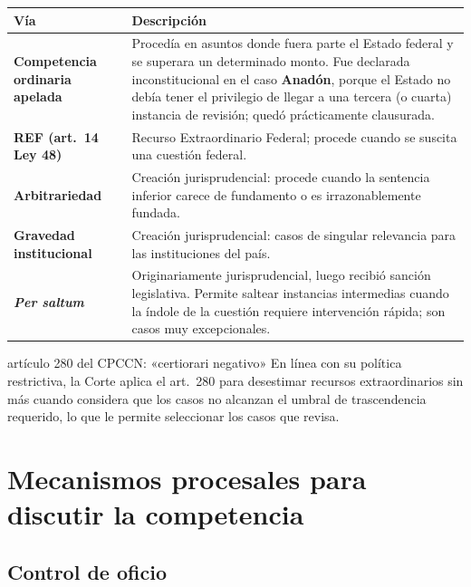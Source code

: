 \documentclass[12pt,oneside]{book}
\renewcommand{\arraystretch}{1.15}
\begin{document}
\begin{table}[H]
\centering
\renewcommand{\arraystretch}{1.3}
\begin{tabularx}{\textwidth}{>{\RaggedRight\arraybackslash}p{}>{\RaggedRight\arraybackslash}X}
\toprule
\textbf{Vía} & \textbf{Descripción} \\
\midrule
\textbf{Competencia ordinaria apelada} & Procedía en asuntos donde fuera parte el Estado federal y se superara un determinado monto. Fue declarada inconstitucional en el caso \textbf{Anadón}, porque el Estado no debía tener el privilegio de llegar a una tercera (o cuarta) instancia de revisión; quedó prácticamente clausurada. \\
\addlinespace
\textbf{REF (art.~14 Ley 48)} & Recurso Extraordinario Federal; procede cuando se suscita una cuestión federal. \\
\addlinespace
\textbf{Arbitrariedad} & Creación jurisprudencial: procede cuando la sentencia inferior carece de fundamento o es irrazonablemente fundada. \\
\addlinespace
\textbf{Gravedad institucional} & Creación jurisprudencial: casos de singular relevancia para las instituciones del país. \\
\addlinespace
\textbf{\textit{Per saltum}} & Originariamente jurisprudencial, luego recibió sanción legislativa. Permite saltear instancias intermedias cuando la índole de la cuestión requiere intervención rápida; son casos muy excepcionales. \\
\bottomrule
\end{tabularx}
\end{table}

\begin{norma}{artículo 280 del CPCCN: «certiorari negativo»}
En línea con su política restrictiva, la Corte aplica el art.~280 para desestimar recursos extraordinarios sin más cuando considera que los casos no alcanzan el umbral de trascendencia requerido, lo que le permite seleccionar los casos que revisa.
\end{norma}

\section{Mecanismos procesales para discutir la competencia}

\subsection{Control de oficio}
\end{document}
